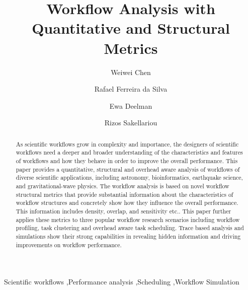 \documentclass[final,5p,times,twocolumn]{elsarticle}
\begin{document}
\begin{frontmatter}


\title{Workflow Analysis with Quantitative and Structural Metrics}


\author[isi]{Weiwei Chen}

\author[lyon]{Rafael Ferreira da Silva}

\author[isi]{Ewa Deelman}


\author[man]{Rizos Sakellariou}



\address[isi]{University of Southern California, Information Sciences Institute,
		Marina del Rey, CA, USA}
\address[lyon]{University of Lyon, CNRS, Villeurbanne, France}
\address[man]{University of Manchester, School of Computer Science, Manchester, U.K.}


\begin{abstract}
As scientific workflows grow in complexity and importance, the designers of scientific workflows need a deeper and broader understanding of the characteristics and features of workflows and how they behave in order to improve the overall performance. 
This paper provides a quantitative, structural and overhead aware analysis of workflows of diverse scientific applications, including astronomy, bioinformatics, earthquake science, and gravitational-wave physics. The workflow analysis is based on novel workflow structural metrics that provide substantial information about the characteristics of workflow structures and concretely show how they influence the overall performance. This information includes density, overlap, and sensitivity etc.. This paper further applies these metrics to three popular workflow research scenarios including workflow profiling, task clustering and overhead aware task scheduling. Trace based analysis and simulations show their strong capabilities in revealing hidden information and driving improvements on workflow performance. 

\end{abstract}

\begin{keyword}
Scientific workflows \sep Performance analysis \sep Scheduling \sep Workflow Simulation
\end{keyword}

\end{frontmatter}
\end{document}
